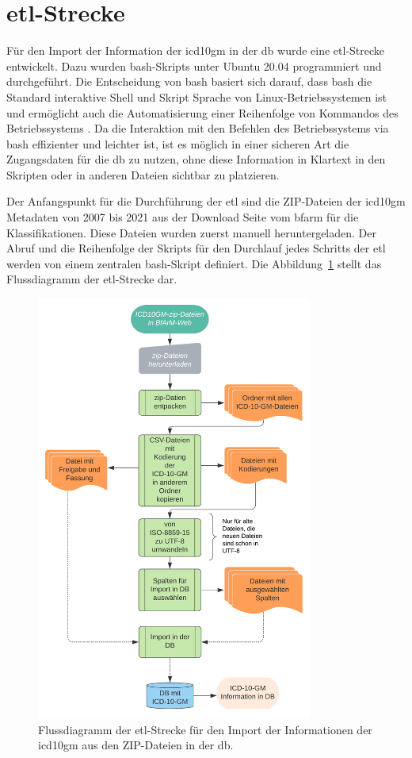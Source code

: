 \section{\acs{etl}-Strecke} \label{sec:etlpipeline}

Für den Import der Information der \ac{icd10gm} in der \ac{db} wurde eine \ac{etl}-Strecke entwickelt. Dazu wurden \ac{bash}-Skripts unter Ubuntu 20.04 programmiert und durchgeführt. Die Entscheidung von \ac{bash} basiert sich darauf, dass \ac{bash} die Standard interaktive Shell und Skript Sprache von Linux-Betriebssystemen ist und ermöglicht auch die Automatisierung einer Reihenfolge von Kommandos des Betriebssystems \cite{bash}. Da die Interaktion mit den Befehlen des Betriebssystems via \ac{bash} effizienter und leichter ist, ist es möglich in einer sicheren Art die Zugangsdaten für die \ac{db} zu nutzen, ohne diese Information in Klartext in den Skripten oder in anderen Dateien sichtbar zu platzieren.

Der Anfangspunkt für die Durchführung der \ac{etl} sind die ZIP-Dateien der \ac{icd10gm} Metadaten von 2007 bis 2021 aus der Download Seite vom \ac{bfarm} für die Klassifikationen. Diese Dateien wurden zuerst manuell heruntergeladen. Der Abruf und die Reihenfolge der Skripts für den Durchlauf jedes Schritts der \ac{etl} werden von einem zentralen \ac{bash}-Skript definiert. Die Abbildung~\ref{fig:etl} stellt das Flussdiagramm der \ac{etl}-Strecke dar.

\clearpage
\begin{figure}[ht]
	\centering
	\includegraphics[height=14cm]{figures/etl}
	\caption[\acs{etl}-Strecke]{Flussdiagramm der \acs{etl}-Strecke für den Import der Informationen der \ac{icd10gm} aus den ZIP-Dateien in der \ac{db}.}
	\label{fig:etl}
\end{figure} 

